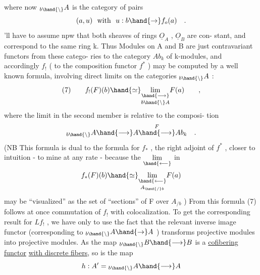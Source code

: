 
where now ${}_{b\hand{\backslash}}A$  is the category of pairs
\[ (a,u) \ \text{ with } \ u: b \hand{\to} f_{o}(a) \quad . \]
'll have to assume npw that both sheaves of rings $\underline{O}_A$ , $\underline{O}_B$  are con-%
stant,  and correspond to the same ring k.   Thus
Modules on A and B are just contravariant functors from these catego-%
ries to the category  $Ab_k$  of  k-modules,  and accordingly $f_!$
(  to the composition functor $f^*$ )  may be computed by a well known
formula,  involving direct limits on the categories ${}_{b\hand{\backslash}}A$ :
\[ (7) \qquad f_!(F)(b) \hand{\simeq} \underset{b\hand{\backslash} A}{\underset{\hand{\longrightarrow}}{\lim}} F(a) \qquad , \]
where the limit in the second member is relative to the  composi-%
tion
\[ {}_{b\hand{\backslash}}A \hand{\longrightarrow} A \overset{\ F\ }{\hand{\longrightarrow}} Ab_k \quad . \]
(NB This formula is dual to the formula for $f_*$ ,  the right adjoint of
$f^*$ ,  closer to intuition  - to mine at any rate -  because the $\underset{\hand{\longleftarrow}}{\lim}$ in
\[ f_*(F)(b) \hand{\simeq} \underset{A_{\hand{/}b}}{\underset{\hand{\longleftarrow}}{\lim}} F(a) \]
may be ``visualized'' as   the  set of ``sections'' of
F over $A_{/b}$ ) From this formula (7) follows at once commutation of
$f_!$  with colocalization.  To get the corresponding result for $Lf_!$ ,
we have only to use the fact that the relevant inverse image functor
(corresponding to  ${}_{b\hand{\backslash}}A \hand{\to} A$ ) transforms projective modules into
projective modules.  As the map  ${}_{b\hand{\backslash}}B \hand{\longrightarrow} B$  is a \uline{cofibering functor}
\uline{with discrete fibers},  so is the map
\[ h: A' = {}_{b\hand{\backslash}}A \hand{\longrightarrow} A \]
